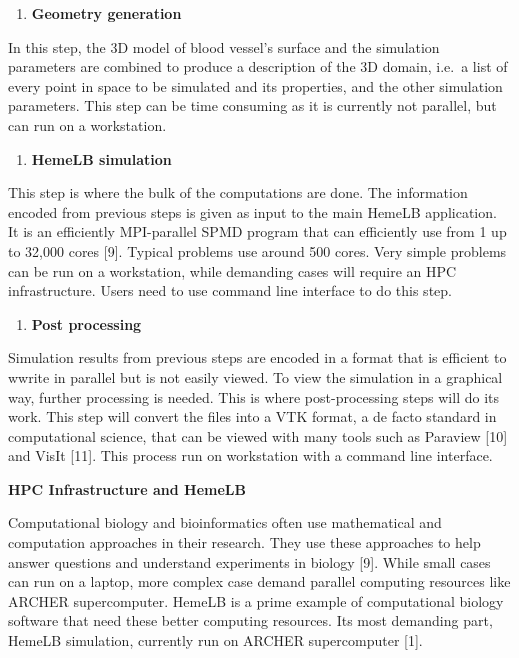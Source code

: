 \documentclass[]{article}
\providecommand{\tightlist}{%
  \setlength{\itemsep}{0pt}\setlength{\parskip}{0pt}}
\begin{document}
\begin{enumerate}
\def\labelenumi{\arabic{enumi}.}
\setcounter{enumi}{2}
\tightlist
\item
  \textbf{Geometry generation}
\end{enumerate}

In this step, the 3D model of blood vessel's surface and the simulation
parameters are combined to produce a description of the 3D domain,
i.e.~a list of every point in space to be simulated and its properties,
and the other simulation parameters. This step can be time consuming as
it is currently not parallel, but can run on a workstation.

\begin{enumerate}
\def\labelenumi{\arabic{enumi}.}
\setcounter{enumi}{3}
\tightlist
\item
  \textbf{HemeLB simulation}
\end{enumerate}

This step is where the bulk of the computations are done. The
information encoded from previous steps is given as input to the main
HemeLB application. It is an efficiently MPI-parallel SPMD program that
can efficiently use from 1 up to 32,000 cores {[}9{]}. Typical problems
use around 500 cores. Very simple problems can be run on a workstation,
while demanding cases will require an HPC infrastructure. Users need to
use command line interface to do this step.

\begin{enumerate}
\def\labelenumi{\arabic{enumi}.}
\setcounter{enumi}{4}
\tightlist
\item
  \textbf{Post processing}
\end{enumerate}

Simulation results from previous steps are encoded in a format that is
efficient to wwrite in parallel but is not easily viewed. To view the
simulation in a graphical way, further processing is needed. This is
where post-processing steps will do its work. This step will convert the
files into a VTK format, a de facto standard in computational science,
that can be viewed with many tools such as Paraview {[}10{]} and VisIt
{[}11{]}. This process run on workstation with a command line interface.

\textbf{HPC Infrastructure and HemeLB}

Computational biology and bioinformatics often use mathematical and
computation approaches in their research. They use these approaches to
help answer questions and understand experiments in biology {[}9{]}.
While small cases can run on a laptop, more complex case demand parallel
computing resources like ARCHER supercomputer. HemeLB is a prime example
of computational biology software that need these better computing
resources. Its most demanding part, HemeLB simulation, currently run on
ARCHER supercomputer {[}1{]}.
\end{document}
